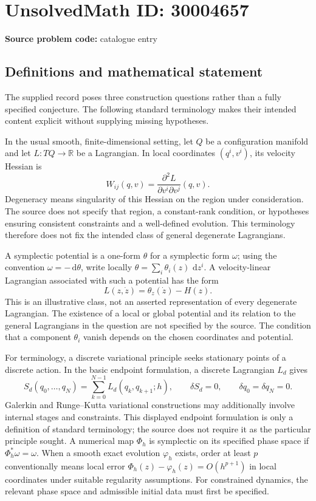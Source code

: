 \documentclass[11pt]{article}
\newcommand{\R}{\mathbb{R}}
\newcommand{\dd}{\,\mathrm{d}}
\begin{document}
\section*{UnsolvedMath ID: 30004657}
\textbf{Source problem code:} catalogue entry
\subsection{Definitions and mathematical statement}
The supplied record poses three construction questions rather than a fully specified conjecture. The following standard terminology makes their intended content explicit without supplying missing hypotheses.

In the usual smooth, finite-dimensional setting, let \(Q\) be a configuration manifold and let \(L:TQ\to\R\) be a Lagrangian. In local coordinates \((q^i,v^i)\), its velocity Hessian is
\[
W_{ij}(q,v)=\frac{\partial^2 L}{\partial v^i\partial v^j}(q,v).
\]
Degeneracy means singularity of this Hessian on the region under consideration. The source does not specify that region, a constant-rank condition, or hypotheses ensuring consistent constraints and a well-defined evolution. This terminology therefore does not fix the intended class of general degenerate Lagrangians.

A symplectic potential is a one-form \(\theta\) for a symplectic form \(\omega\); using the convention \(\omega=-\dd\theta\), write locally \(\theta=\sum_i\theta_i(z)\,\dd z^i\). A velocity-linear Lagrangian associated with such a potential has the form
\[
L(z,\dot z)=\theta_z(\dot z)-H(z).
\]
This is an illustrative class, not an asserted representation of every degenerate Lagrangian. The existence of a local or global potential and its relation to the general Lagrangians in the question are not specified by the source. The condition that a component \(\theta_i\) vanish depends on the chosen coordinates and potential.

For terminology, a discrete variational principle seeks stationary points of a discrete action. In the basic endpoint formulation, a discrete Lagrangian \(L_d\) gives
\[
S_d(q_0,\ldots,q_N)=\sum_{k=0}^{N-1}L_d(q_k,q_{k+1};h),
\qquad \delta S_d=0,
\qquad \delta q_0=\delta q_N=0.
\]
Galerkin and Runge--Kutta variational constructions may additionally involve internal stages and constraints. This displayed endpoint formulation is only a definition of standard terminology; the source does not require it as the particular principle sought. A numerical map \(\Phi_h\) is symplectic on its specified phase space if \(\Phi_h^*\omega=\omega\). When a smooth exact evolution \(\varphi_h\) exists, order at least \(p\) conventionally means local error \(\Phi_h(z)-\varphi_h(z)=O(h^{p+1})\) in local coordinates under suitable regularity assumptions. For constrained dynamics, the relevant phase space and admissible initial data must first be specified.
\end{document}
